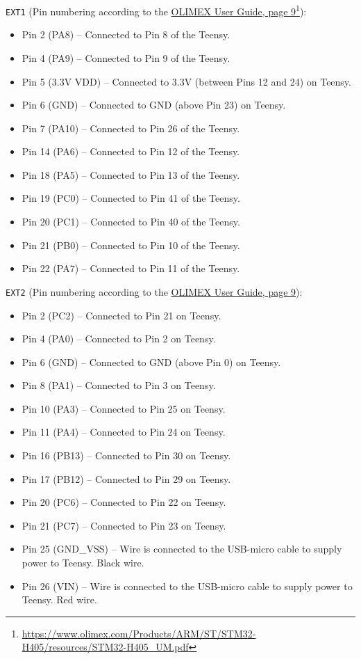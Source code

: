 \verb|EXT1| (Pin numbering according to the \href{https://www.olimex.com/Products/ARM/ST/STM32-H405/resources/STM32-H405_UM.pdf}{OLIMEX User Guide, page 9}\footnote{\href{https://www.olimex.com/Products/ARM/ST/STM32-H405/resources/STM32-H405_UM.pdf}{https://www.olimex.com/Products/ARM/ST/STM32-H405/resources/STM32-H405_UM.pdf}}):
\begin{itemize}[noitemsep]
  \item Pin 2 (PA8) -- Connected to Pin 8 of the Teensy.
  \item Pin 4 (PA9) -- Connected to Pin 9 of the Teensy.
  \item Pin 5 (3.3V VDD) -- Connected to 3.3V (between Pins 12 and 24) on Teensy.
  \item Pin 6 (GND) -- Connected to GND (above Pin 23) on Teensy.
  \item Pin 7 (PA10) -- Connected to Pin 26 of the Teensy.
  \item Pin 14 (PA6) -- Connected to Pin 12 of the Teensy.
  \item Pin 18 (PA5) -- Connected to Pin 13 of the Teensy.
  \item Pin 19 (PC0) -- Connected to Pin 41 of the Teensy.
  \item Pin 20 (PC1) -- Connected to Pin 40 of the Teensy.
  \item Pin 21 (PB0) -- Connected to Pin 10 of the Teensy.
  \item Pin 22 (PA7) -- Connected to Pin 11 of the Teensy.
\end{itemize}

\verb|EXT2| (Pin numbering according to the \href{https://www.olimex.com/Products/ARM/ST/STM32-H405/resources/STM32-H405_UM.pdf}{OLIMEX User Guide, page 9}):
\begin{itemize}[noitemsep]
  \item Pin 2 (PC2) -- Connected to Pin 21 on Teensy.
  \item Pin 4 (PA0) -- Connected to Pin 2 on Teensy.
  \item Pin 6 (GND) -- Connected to GND (above Pin 0) on Teensy.
  \item Pin 8 (PA1) -- Connected to Pin 3 on Teensy.
  \item Pin 10 (PA3) -- Connected to Pin 25 on Teensy.
  \item Pin 11 (PA4) -- Connected to Pin 24 on Teensy.
  \item Pin 16 (PB13) -- Connected to Pin 30 on Teensy.
  \item Pin 17 (PB12) -- Connected to Pin 29 on Teensy.
  \item Pin 20 (PC6) -- Connected to Pin 22 on Teensy.
  \item Pin 21 (PC7) -- Connected to Pin 23 on Teensy.
  \item Pin 25 (GND\_VSS) -- Wire is connected to the USB-micro cable to supply power to Teensy. Black wire.
  \item Pin 26 (VIN) -- Wire is connected to the USB-micro cable to supply power to Teensy. Red wire.
\end{itemize}

